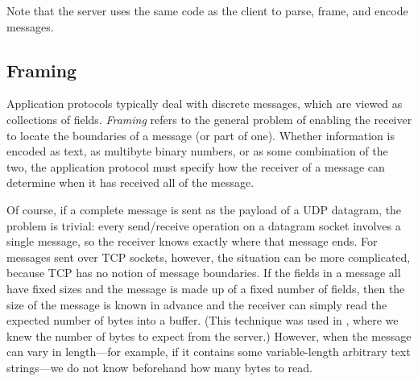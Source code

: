 \begin{topcode}





\begin{bottomcode}




Note that the server uses the same code as the client to parse,
frame, and encode messages.
\end{bottomcode}


\end{topcode}

\subsection{Framing}
\label{sect:framing}

Application protocols typically deal
with discrete messages, which are viewed as collections of fields.
\emph{Framing} refers to the general problem of enabling the receiver to
locate the boundaries of a message (or part of one).
Whether information is
encoded as text, as multibyte binary numbers, or as some combination
of the two, the application protocol must specify how the receiver of
a message can determine when it has received all of the message.

Of course, if a complete message is sent as the payload
of a UDP datagram, the problem is trivial:
every send/receive operation on a datagram socket involves a single
message, so the receiver knows exactly where that message ends.
For messages sent over TCP sockets, however, the situation can be more
complicated, because TCP has no notion of message boundaries.
If the fields in a message all have fixed sizes and the message is
made up of a fixed number of fields, then
the size of the message is known in advance and the receiver
can simply read the expected number of bytes into a buffer.
(This  technique was used in , where
we knew the number of bytes to expect from the server.)
However, when the message can vary in length---for example, if it
contains some variable-length arbitrary text strings---we do
not know beforehand how many bytes to read.

